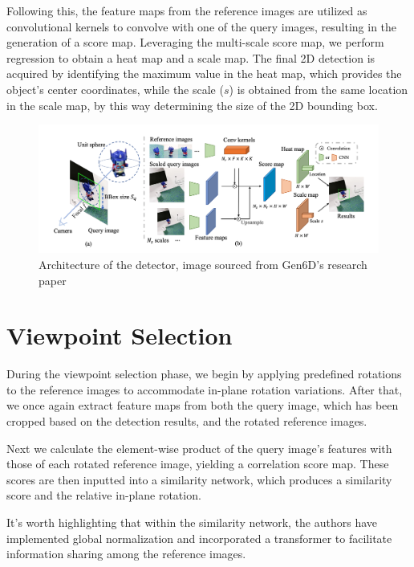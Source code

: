 Following this, the feature maps from the reference images are utilized as convolutional kernels to convolve with one of the query images, resulting in the generation of a score map. Leveraging the multi-scale score map, we perform regression to obtain a heat map and a scale map. The final 2D detection is acquired by identifying the maximum value in the heat map, which provides the object's center coordinates, while the scale ($s$) is obtained from the same location in the scale map, by this way determining the size of the 2D bounding box.

\begin{figure}[ht]
  \centering
  \includegraphics[width=\textwidth]{data/gen6d2.png}
  \caption{Architecture of the detector, image sourced from Gen6D's research paper}
  \label{fig:fig13}
\end{figure}

\section{Viewpoint Selection}

During the viewpoint selection phase, we begin by applying predefined rotations to the reference images to accommodate in-plane rotation variations. After that, we once again extract feature maps from both the query image, which has been cropped based on the detection results, and the rotated reference images.

Next we calculate the element-wise product of the query image's features with those of each rotated reference image, yielding a correlation score map. These scores are then inputted into a similarity network, which produces a similarity score and the relative in-plane rotation.

It's worth highlighting that within the similarity network, the authors have implemented global normalization and incorporated a transformer to facilitate information sharing among the reference images.

